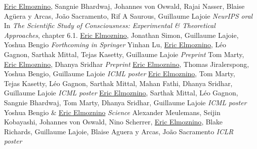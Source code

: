 \documentclass[letterpaper]{twentysecondcv} %
\begin{document}
\begin{pub}
	              {\underline{Eric Elmoznino}, Sangnie Bhardwaj, Johannes von Oswald, Rajai Nasser, Blaise Agüera y Arcas, João Sacramento, Rif A Saurous, Guillaume Lajoie \textit{NeurIPS oral}}
	              {In \textit{The Scientific Study of Consciousness: Experimental \& Theoretical Approaches}, chapter 6.1. \underline{Eric Elmoznino}, Jonathan Simon, Guillaume Lajoie, Yoshua Bengio \textit{Forthcoming in Springer}}
	              {Yinhan Lu, \underline{Eric Elmoznino}, Léo Gagnon, Sarthak Mittal, Tejas Kasetty, Guillaume Lajoie \textit{Preprint}}
	              {Tom Marty, \underline{Eric Elmoznino}, Dhanya Sridhar \textit{Preprint}}
	              {\underline{Eric Elmoznino}, Thomas Jiralerspong, Yoshua Bengio, Guillaume Lajoie \textit{ICML poster}}
	              {\underline{Eric Elmoznino}, Tom Marty, Tejas Kasetty, Léo Gagnon, Sarthak Mittal, Mahan Fathi, Dhanya Sridhar, Guillaume Lajoie \textit{ICML poster}}
	              {\underline{Eric Elmoznino}, Sarthak Mittal, Léo Gagnon, Sangnie Bhardwaj, Tom Marty, Dhanya Sridhar, Guillaume Lajoie \textit{ICML poster}}
	              {Yoshua Bengio \& \underline{Eric Elmoznino} \textit{Science}}
	              {Alexander Meulemans, Seijin Kobayashi, Johannes von Oswald, Nino Scherrer, \underline{Eric Elmoznino}, Blake Richards, Guillaume Lajoie, Blaise Aguera y Arcas, $\text{Jo\~{a}o}$ Sacramento \textit{ICLR poster}}

\end{pub}
\end{document}
